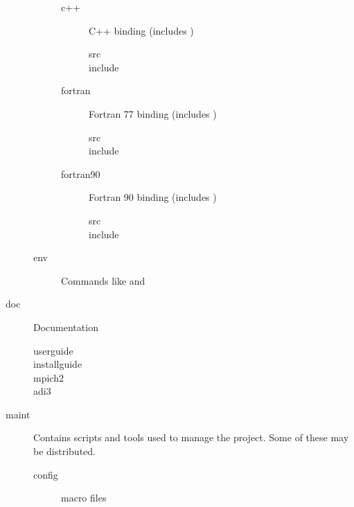 \documentclass{article}
\begin{document}
\begin{description}
\begin{description}
    \begin{description}
    \item[c++]C++ binding (includes )
      \begin{description}
      \item[src]
      \item[include]
      \end{description}
    \item[fortran]Fortran 77 binding (includes )
      \begin{description}
      \item[src]
      \item[include]
      \end{description}
    \item[fortran90]Fortran 90 binding (includes )
      \begin{description}
      \item[src]
      \item[include]
      \end{description}
    \end{description}
  \item[env]Commands like  and 
  \end{description}
  

\item[doc]Documentation
  \begin{description}
    \item[userguide]
    \item[installguide]
    \item[mpich2]
    \item[adi3]
  \end{description}


\item[maint]
  Contains scripts and tools used to manage the project.  Some of these may be
  distributed.
  \begin{description}
  \item[config] macro files
  \end{description}


\end{description}
\end{document}
